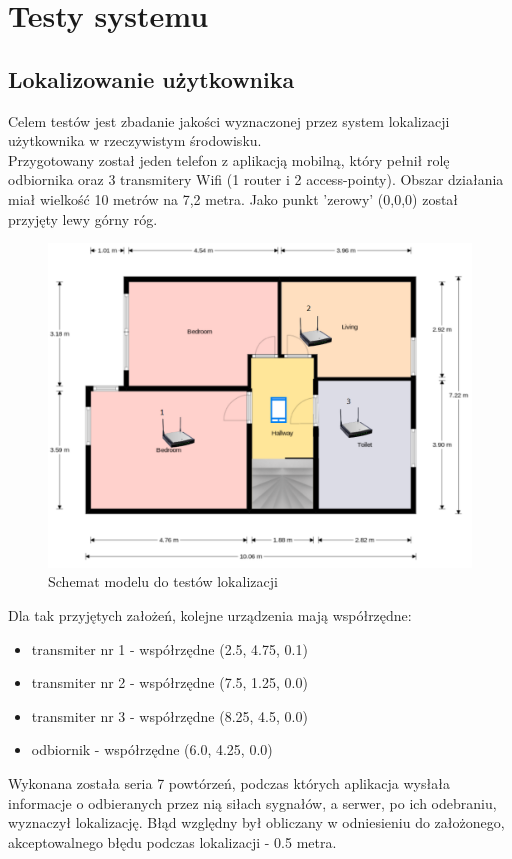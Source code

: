 \chapter{Testy systemu}
\section{Lokalizowanie użytkownika}
Celem testów jest zbadanie jakości wyznaczonej przez system lokalizacji użytkownika w rzeczywistym środowisku.\\
Przygotowany został jeden telefon z aplikacją mobilną, który pełnił rolę odbiornika oraz 3 transmitery Wifi (1 router i 2 access-pointy). Obszar działania miał wielkość 10 metrów na 7,2 metra. Jako punkt 'zerowy' (0,0,0) został przyjęty lewy górny róg. 
\begin{figure}[H]			
	\centering
	\caption{Schemat modelu do testów lokalizacji}
	\includegraphics[width=1.0\textwidth]{plan}
\end{figure}
Dla tak przyjętych założeń, kolejne urządzenia mają współrzędne:
\begin{itemize}
	\item transmiter nr 1 - współrzędne (2.5, 4.75, 0.1)
	\item transmiter nr 2 - współrzędne (7.5, 1.25, 0.0)
	\item transmiter nr 3 - współrzędne (8.25, 4.5, 0.0)
	\item odbiornik - współrzędne (6.0, 4.25, 0.0)
\end{itemize}
Wykonana została seria 7 powtórzeń, podczas których aplikacja wysłała informacje o odbieranych przez nią siłach sygnałów, a serwer, po ich odebraniu, wyznaczył lokalizację. Błąd względny był obliczany w odniesieniu do założonego, akceptowalnego błędu podczas lokalizacji - 0.5 metra.
